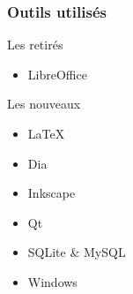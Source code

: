 \begin{frame}
\frametitle{Outils utilisés}

\begin{block}{Les retirés}
\begin{itemize}
    \item LibreOffice %
\end{itemize}
\end{block}

\begin{block}{Les nouveaux}
\begin{itemize}
    \item \LaTeX %
    \item Dia %
    \item Inkscape %
    \item Qt %
    \item SQLite \& MySQL %
    \item Windows %
\end{itemize}
\end{block}

\end{frame} %

